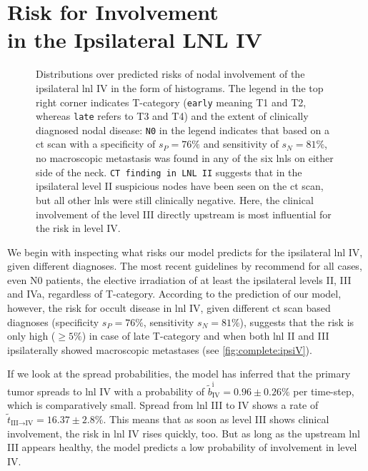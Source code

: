 \documentclass[\relativeRoot/main.tex]{subfiles}
\begin{document}
\section[Risk for Involvement in the Ipsilateral LNL IV]{Risk for Involvement\\in the Ipsilateral LNL IV}
\label{sec:complete:ipsiIV}

\begin{figure}
    \centering
    \def\svgwidth{1.0\textwidth}
    
    \caption[
        Prediction by the complete model on ipsi LNL IV involvement
    ]{
        Distributions over predicted risks of nodal involvement of the ipsilateral \gls{lnl} IV in the form of histograms. The legend in the top right corner indicates T-category (\texttt{early} meaning T1 and T2, whereas \texttt{late} refers to T3 and T4) and the extent of clinically diagnosed nodal disease: \texttt{N0} in the legend indicates that based on a \gls{ct} scan with a specificity of $s_P = 76\%$ and sensitivity of $s_N = 81\%$, no macroscopic metastasis was found in any of the six \glspl{lnl} on either side of the neck. \texttt{CT finding in LNL II} suggests that in the ipsilateral level II suspicious nodes have been seen on the \gls{ct} scan, but all other \glspl{lnl} were still clinically negative. Here, the clinical involvement of the level III directly upstream is most influential for the risk in level IV.
    }
    \label{fig:complete:ipsiIV}
\end{figure}

We begin with inspecting what risks our model predicts for the ipsilateral \gls{lnl} IV, given different diagnoses. The most recent guidelines by  recommend for all cases, even N0 patients, the elective irradiation of at least the ipsilateral levels II, III and IVa, regardless of T-category. According to the prediction of our model, however, the risk for occult disease in \gls{lnl} IV, given different \gls{ct} scan based diagnoses (specificity $s_P = 76\%$, sensitivity $s_N = 81\%$), suggests that the risk is only high ($\geq 5\%$) in case of late T-category and when both \gls{lnl} II and III ipsilaterally showed macroscopic metastases (see \cref{fig:complete:ipsiV}).

If we look at the spread probabilities, the model has inferred that the primary tumor spreads to \gls{lnl} IV with a probability of $\tilde{b}_\text{IV}^\text{i} = 0.96 \pm 0.26 \%$ per time-step, which is comparatively small. Spread from \gls{lnl} III to IV shows a rate of $\tilde{t}_{\text{III}\rightarrow\text{IV}} = 16.37 \pm 2.8 \%$. This means that as soon as level III shows clinical involvement, the risk in \gls{lnl} IV rises quickly, too. But as long as the upstream \gls{lnl} III appears healthy, the model predicts a low probability of involvement in level IV.
\end{document}
